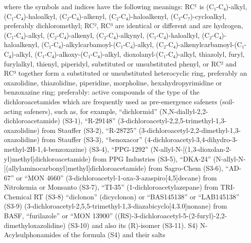 \documentclass[11pt,a4paper]{article}
\begin{document}
where the symbols and indices have the following meanings: RC¹ is (C₁-C₄)-alkyl, (C₁-C₄)-haloalkyl, (C₂-C₄)-alkenyl, (C₂-C₄)-haloalkenyl, (C₃-C₇)-cycloalkyl, preferably dichloromethyl; RC², RC³ are identical or different and are hydrogen, (C₁-C₄)-alkyl, (C₂-C₄)-alkenyl, (C₂-C₄)-alkynyl, (C₁-C₄)-haloalkyl, (C₂-C₄)-haloalkenyl, (C₁-C₄)-alkylcarbamoyl-(C₁-C₄)-alkyl, (C₂-C₄)-alkenylcarbamoyl-(C₁-C₄)-alkyl, (C₁-C₄)-alkoxy-(C₁-C₄)-alkyl, dioxolanyl-(C₁-C₄)-alkyl, thiazolyl, furyl, furylalkyl, thienyl, piperidyl, substituted or unsubstituted phenyl, or RC² and RC³ together form a substituted or unsubstituted heterocyclic ring, preferably an oxazolidine, thiazolidine, piperidine, morpholine, hexahydropyrimidine or benzoxazine ring; preferably: active compounds of the type of the dichloroacetamides which are frequently used as pre-emergence safeners (soil-acting safeners), such as, for example, “dichlormid” (N,N-diallyl-2,2-dichloroacetamide) (S3-1), “R-29148” (3-dichloroacetyl-2,2,5-trimethyl-1,3-oxazolidine) from Stauffer (S3-2), “R-28725” (3-dichloroacetyl-2,2-dimethyl-1,3-oxazolidine) from Stauffer (S3-3), “benoxacor” (4-dichloroacetyl-3,4-dihydro-3-methyl-2H-1,4-benzoxazine) (S3-4), “PPG-1292” (N-allyl-N-[(1,3-dioxolan-2-yl)methyl]dichloroacetamide) from PPG Industries (S3-5), “DKA-24” (N-allyl-N-[(allylaminocarbonyl)methyl]dichloroacetamide) from Sagro-Chem (S3-6), “AD-67” or “MON 4660” (3-dichloroacetyl-1-oxa-3-azaspiro[4,5]decane) from Nitrokemia or Monsanto (S3-7), “TI-35” (1-dichloroacetylazepane) from TRI-Chemical RT (S3-8) “diclonon” (dicyclonon) or “BAS145138” or “LAB145138” (S3-9) (3-dichloroacetyl-2,5,5-trimethyl-1,3-diazabicyclo[4.3.0]nonane) from BASF, “furilazole” or “MON 13900” ((RS)-3-dichloroacetyl-5-(2-furyl)-2,2-dimethyloxazolidine) (S3-10) and also its (R)-isomer (S3-11). S4) N-Acylsulphonamides of the formula (S4) and their salts
\end{document}
